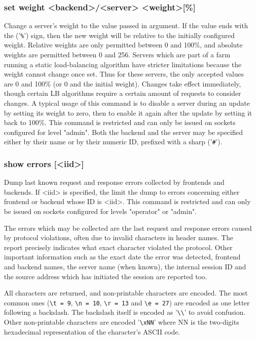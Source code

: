 \subsubsection[set weight]{set weight <backend>/<server> <weight>[\%]}
  Change a server's weight to the value passed in argument. If the value ends
  with the ('\verb|%|') sign, then the new weight will be relative to the initially
  configured weight. Relative weights are only permitted between 0 and 100\%,
  and absolute weights are permitted between 0 and 256. Servers which are part
  of a farm running a static load-balancing algorithm have stricter limitations
  because the weight cannot change once set. Thus for these servers, the only
  accepted values are 0 and 100\% (or 0 and the initial weight). Changes take
  effect immediately, though certain LB algorithms require a certain amount of
  requests to consider changes. A typical usage of this command is to disable
  a server during an update by setting its weight to zero, then to enable it
  again after the update by setting it back to 100\%. This command is restricted
  and can only be issued on sockets configured for level "admin". Both the
  backend and the server may be specified either by their name or by their
  numeric ID, prefixed with a sharp ('\verb|#|').

\subsubsection[show errors]{show errors [<iid>]}
  Dump last known request and response errors collected by frontends and
  backends. If <iid> is specified, the limit the dump to errors concerning
  either frontend or backend whose ID is <iid>. This command is restricted
  and can only be issued on sockets configured for levels "operator" or
  "admin".

  The errors which may be collected are the last request and response errors
  caused by protocol violations, often due to invalid characters in header
  names. The report precisely indicates what exact character violated the
  protocol. Other important information such as the exact date the error was
  detected, frontend and backend names, the server name (when known), the
  internal session ID and the source address which has initiated the session
  are reported too.

  All characters are returned, and non-printable characters are encoded. The
  most common ones (\verb|\t = 9|, \verb|\n = 10|, \verb|\r = 13| and \verb|\e = 27|) are encoded as one
  letter following a backslash. The backslash itself is encoded as
  '\verb|\\|' to
  avoid confusion. Other non-printable characters are encoded '\verb|\xNN|' where
  NN is the two-digits hexadecimal representation of the character's ASCII
  code.

